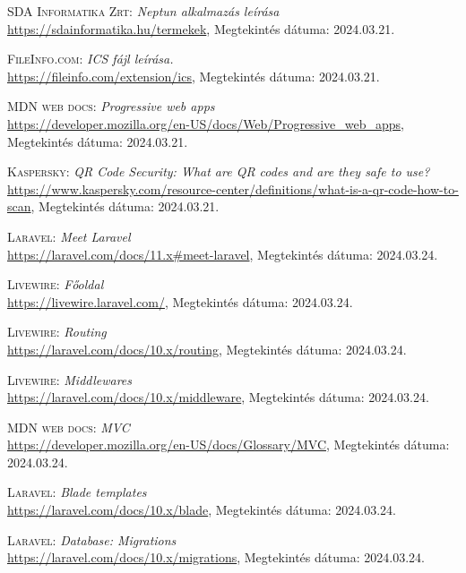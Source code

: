 \documentclass[
]{thesis-ekf}
\theoremstyle{definition}
\theoremstyle{remark}
\begin{document}
\begin{thebibliography}{47}

\textsc{SDA Informatika Zrt:} \emph{Neptun alkalmazás leírása}
\\
\url{https://sdainformatika.hu/termekek}, Megtekintés dátuma: 2024.03.21.

\textsc{FileInfo.com}: \emph{ICS fájl leírása.}
\\
\url{https://fileinfo.com/extension/ics}, Megtekintés dátuma: 2024.03.21.

\textsc{MDN web docs}: \emph{Progressive web apps}
\\
\url{https://developer.mozilla.org/en-US/docs/Web/Progressive_web_apps}, Megtekintés dátuma: 2024.03.21.

\textsc{Kaspersky}: \emph{QR Code Security: What are QR codes and are they safe to use?}
\\
\url{https://www.kaspersky.com/resource-center/definitions/what-is-a-qr-code-how-to-scan}, Megtekintés dátuma: 2024.03.21.

\textsc{Laravel}: \emph{Meet Laravel}
\\
\url{https://laravel.com/docs/11.x#meet-laravel}, Megtekintés dátuma: 2024.03.24.

\textsc{Livewire}: \emph{Főoldal}
\\
\url{https://livewire.laravel.com/}, Megtekintés dátuma: 2024.03.24.

\textsc{Livewire}: \emph{Routing}
\\
\url{https://laravel.com/docs/10.x/routing}, Megtekintés dátuma: 2024.03.24.

\textsc{Livewire}: \emph{Middlewares}
\\
\url{https://laravel.com/docs/10.x/middleware}, Megtekintés dátuma: 2024.03.24.

\textsc{MDN web docs}: \emph{MVC}
\\
\url{https://developer.mozilla.org/en-US/docs/Glossary/MVC}, Megtekintés dátuma: 2024.03.24.

\textsc{Laravel}: \emph{Blade templates}
\\
\url{https://laravel.com/docs/10.x/blade}, Megtekintés dátuma: 2024.03.24.

\textsc{Laravel}: \emph{Database: Migrations}
\\
\url{https://laravel.com/docs/10.x/migrations}, Megtekintés dátuma: 2024.03.24.


\end{thebibliography}
\end{document}
